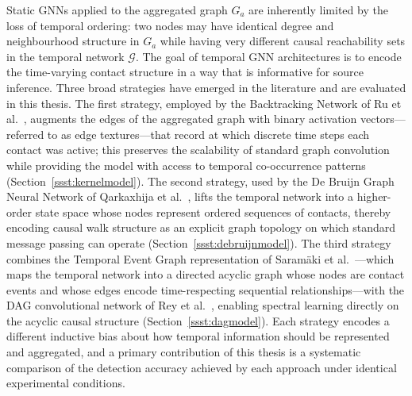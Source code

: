 Static GNNs applied to the aggregated graph $G_a$ are inherently limited by the loss of temporal ordering: two nodes may have identical degree and neighbourhood structure in $G_a$ while having very different causal reachability sets in the temporal network $\mathcal{G}$. The goal of temporal GNN architectures is to encode the time-varying contact structure in a way that is informative for source inference. Three broad strategies have emerged in the literature and are evaluated in this thesis. The first strategy, employed by the Backtracking Network of Ru et al.~\cite{Ru2023}, augments the edges of the aggregated graph with binary activation vectors---referred to as edge textures---that record at which discrete time steps each contact was active; this preserves the scalability of standard graph convolution while providing the model with access to temporal co-occurrence patterns (Section~\ref{ssst:kernelmodel}). The second strategy, used by the De Bruijn Graph Neural Network of Qarkaxhija et al.~\cite{Qarkaxhija2022}, lifts the temporal network into a higher-order state space whose nodes represent ordered sequences of contacts, thereby encoding causal walk structure as an explicit graph topology on which standard message passing can operate (Section~\ref{ssst:debruijnmodel}). The third strategy combines the Temporal Event Graph representation of Saram\"{a}ki et al.~\cite{Saramaki2019}---which maps the temporal network into a directed acyclic graph whose nodes are contact events and whose edges encode time-respecting sequential relationships---with the DAG convolutional network of Rey et al.~\cite{Rey2025}, enabling spectral learning directly on the acyclic causal structure (Section~\ref{ssst:dagmodel}). Each strategy encodes a different inductive bias about how temporal information should be represented and aggregated, and a primary contribution of this thesis is a systematic comparison of the detection accuracy achieved by each approach under identical experimental conditions.
